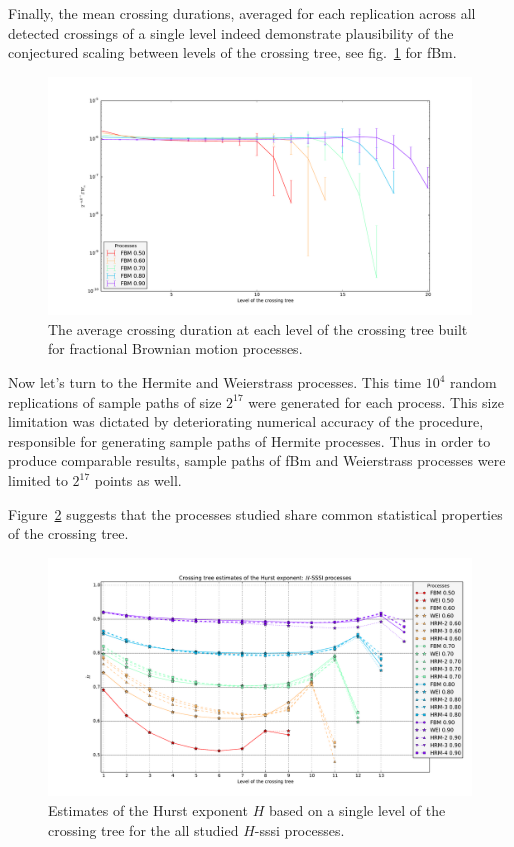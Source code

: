 \documentclass[a4paper]{article}
\begin{document}
Finally, the mean crossing durations, averaged for each replication across all detected
crossings of a single level indeed demonstrate plausibility of the conjectured scaling
between levels of the crossing tree, see fig.~\ref{fig:fbm_avg_crossing_durations} for fBm.
\begin{figure}[htb]\begin{center}
    \includegraphics[width=6in]{images/fbm_fig_08_med_1000-21}
    \caption{The average crossing duration at each level of the crossing tree built
    for fractional Brownian motion processes.}
\label{fig:fbm_avg_crossing_durations}
\end{center}\end{figure}

Now let's turn to the Hermite and Weierstrass processes. This time $10^4$ random
replications of sample paths of size $2^{17}$ were generated for each process.
This size limitation was dictated by deteriorating numerical accuracy of the procedure,
responsible for generating sample paths of Hermite processes. Thus in order to produce
comparable results, sample paths of fBm and Weierstrass processes were limited to $2^{17}$
points as well.

Figure~\ref{fig:all_hurst_crossing_tree} suggests that the processes studied share common
statistical properties of the crossing tree.
\begin{figure}[htb]\begin{center}
    \includegraphics[width=6in]{images/fig_05_med_10000-17}
    \caption{Estimates of the Hurst exponent $H$ based on a single level of the crossing tree for
    the all studied $H$-sssi processes.}
\label{fig:all_hurst_crossing_tree}
\end{center}\end{figure}
\end{document}
